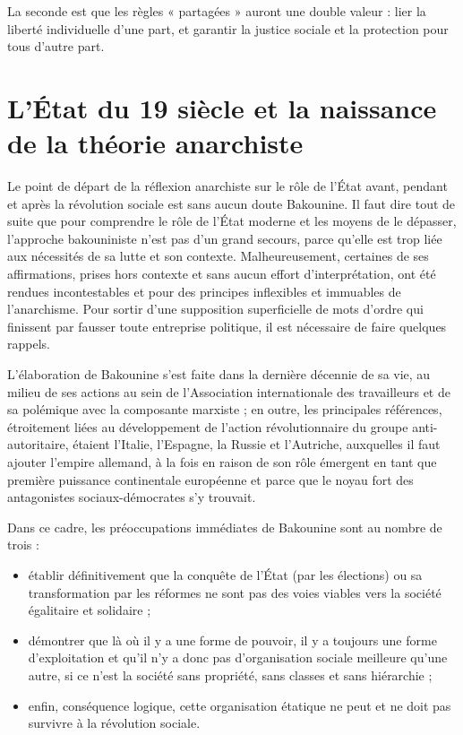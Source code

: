 La seconde est que les règles « partagées » auront une double valeur : lier la liberté individuelle d'une part, et garantir la justice sociale et la protection pour tous d'autre part.

\chapter{L'État du 19\ieme{} siècle et la naissance de la théorie anarchiste}

Le point de départ de la réflexion anarchiste sur le rôle de l'État avant, pendant et après la révolution sociale est sans aucun doute Bakounine. Il faut dire tout de suite que pour comprendre le rôle de l'État moderne et les moyens de le dépasser, l'approche bakouniniste n'est pas d'un grand secours, parce qu'elle est trop liée aux nécessités de sa lutte et son contexte. Malheureusement, certaines de ses affirmations, prises hors contexte et sans aucun effort d'interprétation, ont été rendues incontestables et pour des principes inflexibles et immuables de l'anarchisme. Pour sortir d'une supposition superficielle de mots d'ordre qui finissent par fausser toute entreprise politique, il est nécessaire de faire quelques rappels.

L'élaboration de Bakounine s'est faite dans la dernière décennie de sa vie, au milieu de ses actions au sein de l'Association internationale des travailleurs et de sa polémique avec la composante marxiste ; en outre, les principales références, étroitement liées au développement de l'action révolutionnaire du groupe anti-autoritaire, étaient l'Italie, l'Espagne, la Russie et l'Autriche, auxquelles il faut ajouter l'empire allemand, à la fois en raison de son rôle émergent en tant que première puissance continentale européenne et parce que le noyau fort des antagonistes sociaux-démocrates s'y trouvait.

Dans ce cadre, les préoccupations immédiates de Bakounine sont au nombre de trois :

\begin{itemize}
\item établir définitivement que la conquête de l'État (par les élections) ou sa transformation par les réformes ne sont pas des voies viables vers la société égalitaire et solidaire ;
\item démontrer que là où il y a une forme de pouvoir, il y a toujours une forme d'exploitation et qu'il n'y a donc pas d'organisation sociale meilleure qu'une autre, si ce n'est la société sans propriété, sans classes et sans hiérarchie ;
\item enfin, conséquence logique, cette organisation étatique ne peut et ne doit pas survivre à la révolution sociale.
\end{itemize}

